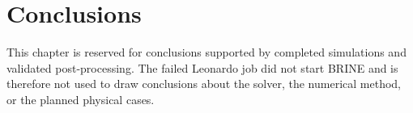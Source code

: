 \chapter{Conclusions}
\label{ch:conclusions}

This chapter is reserved for conclusions supported by completed simulations and
validated post-processing. The failed Leonardo job did not start BRINE and is
therefore not used to draw conclusions about the solver, the numerical method,
or the planned physical cases.
